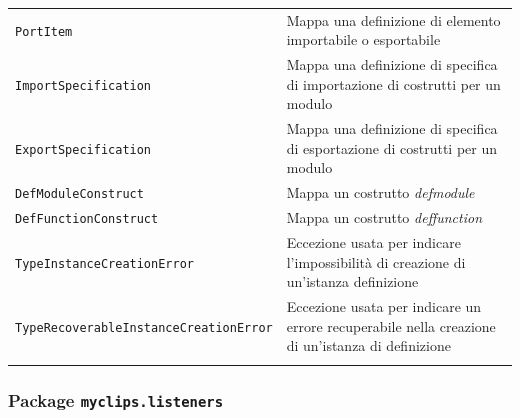 \begin{longtable}{p{5.5cm}p{6.5cm}}
	\hdashline[1pt/5pt]
		\texttt{PortItem} & Mappa una definizione di elemento importabile o esportabile\\ 
	\hdashline[1pt/5pt]
		\texttt{ImportSpecification} & Mappa una definizione di specifica di importazione di costrutti per un modulo\\ 
	\hdashline[1pt/5pt]
		\texttt{ExportSpecification} & Mappa una definizione di specifica di esportazione di costrutti per un modulo\\ 
	\hdashline[1pt/5pt]
		\texttt{DefModuleConstruct} & Mappa un costrutto \emph{defmodule}\\ 
	\hdashline[1pt/5pt]
		\texttt{DefFunctionConstruct} & Mappa un costrutto \emph{deffunction}\\ 
	\hdashline[1pt/5pt]
		\texttt{TypeInstanceCreationError} & Eccezione usata per indicare l'impossibilità di creazione di un'istanza definizione\\ 
	\hdashline[1pt/5pt]
		\texttt{Type\-Recoverable\-Instance\-Creation\-Error} & Eccezione usata per indicare un errore recuperabile nella creazione di un'istanza di definizione\\ 
	\hline\\

\end{longtable}


\subsubsection{Package \texttt{myclips.listeners}}


